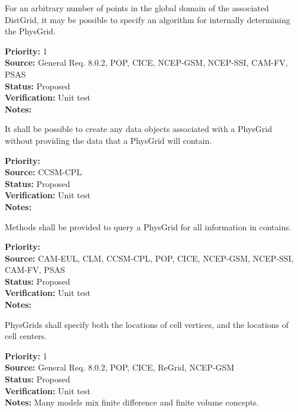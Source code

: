 For an arbitrary number of points in the global domain of the associated
DistGrid, it may be possible to specify an algorithm for internally
determining the PhysGrid.
\begin{reqlist}
{\bf Priority:} 1 \\
{\bf Source:} General Req. 8.0.2, POP, CICE, NCEP-GSM, NCEP-SSI,
              CAM-FV, PSAS \\
{\bf Status:} Proposed \\
{\bf Verification:} Unit test\\
{\bf Notes:} 
\end{reqlist}

It shall be possible to create any data objects associated with a PhysGrid without
providing the data that a PhysGrid will contain.
\begin{reqlist}
{\bf Priority:} \\
{\bf Source:} CCSM-CPL \\
{\bf Status:} Proposed \\
{\bf Verification:} Unit test\\
{\bf Notes:} 
\end{reqlist}

Methods shall be provided to query a PhysGrid for all information in contains.
\begin{reqlist}
{\bf Priority:} \\
{\bf Source:} CAM-EUL, CLM, CCSM-CPL, POP, CICE, NCEP-GSM, NCEP-SSI,
              CAM-FV, PSAS \\
{\bf Status:} Proposed \\
{\bf Verification:} Unit test\\
{\bf Notes:} 
\end{reqlist}

PhysGrids shall specify both the locations of cell vertices, and the locations
of cell centers.
\begin{reqlist}
{\bf Priority:} 1 \\
{\bf Source:} General Req. 8.0.2, POP, CICE, ReGrid, NCEP-GSM \\
{\bf Status:} Proposed \\
{\bf Verification:} Unit test\\
{\bf Notes:} Many models mix finite difference and finite volume concepts.
\end{reqlist}


